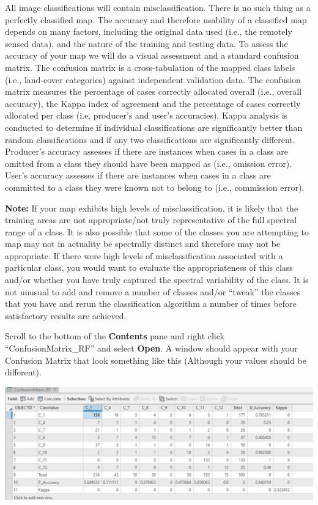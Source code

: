 \documentclass[
]{book}
\begin{document}
All image classifications will contain misclassification. There is no such thing as a perfectly classified map. The accuracy and therefore usability of a classified map depends on many factors, including the original data used (i.e., the remotely sensed data), and the nature of the training and testing data.
To assess the accuracy of your map we will do a visual assessment and a standard confusion matrix. The confusion matrix is a cross-tabulation of the mapped class labels (i.e., land-cover categories) against independent validation data. The confusion matrix measures the percentage of cases correctly allocated overall (i.e., overall accuracy), the Kappa index of agreement and the percentage of cases correctly allocated per class (i.e, producer's and user's accuracies). Kappa analysis is conducted to determine if individual classifications are significantly better than random classifications and if any two classifications are significantly different. Producer's accuracy assesses if there are instances when cases in a class are omitted from a class they should have been mapped as (i.e., omission error). User's accuracy assesses if there are instances when cases in a class are committed to a class they were known not to belong to (i.e., commission error).

\textbf{Note:} If your map exhibits high levels of misclassification, it is likely that the training areas are not appropriate/not truly representative of the full spectral range of a class. It is also possible that some of the classes you are attempting to map may not in actuality be spectrally distinct and therefore may not be appropriate. If there were high levels of misclassification associated with a particular class, you would want to evaluate the appropriateness of this class and/or whether you have truly captured the spectral variability of the class. It is not unusual to add and remove a number of classes and/or ``tweak'' the classes that you have and rerun the classification algorithm a number of times before satisfactory results are achieved.

Scroll to the bottom of the \textbf{Contents} pane and right click ``ConfusionMatrix\_RF'' and select \textbf{Open}. A window should appear with your Confusion Matrix that look something like this (Although your values should be different).

\begin{center}\includegraphics[width=0.8\linewidth]{images/08-confusion-matrix-table} \end{center}
\end{document}
